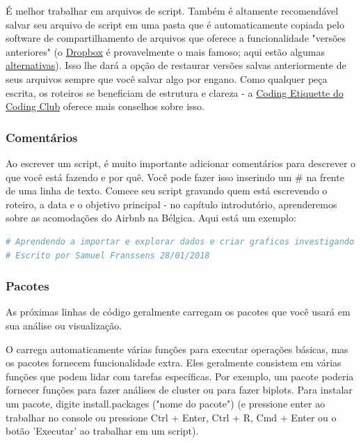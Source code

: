 \documentclass{article}
\begin{document}
É melhor trabalhar em arquivos de script. Também é altamente recomendável salvar seu arquivo de script em uma pasta que é automaticamente copiada pelo software de compartilhamento de arquivos que oferece a funcionalidade "versões anteriores" (o \href{https://www.dropbox.com/business/landing-t61fl-v2?_tk=paid_sem_goog_biz_b&_camp=1411326950&_kw=dropbox|e&_ad=389658655593||c&gclid=CjwKCAjwtqj2BRBYEiwAqfzur1JwrYwkXrKtxYHo_nfrnCMIUBe-IpmrIgCZmTt0l3gibHmKgokdvBoChx8QAvD_BwE}{Dropbox} é provavelmente o mais famoso; aqui estão algumas \href{https://medium.com/@Vanina/dropbox-alternatives-top-5best-cloud-storage-services-2017-a703af7d7796}{alternativas}). Isso lhe dará a opção de restaurar versões salvas anteriormente de seus arquivos sempre que você salvar algo por engano. Como qualquer peça escrita, os roteiros se beneficiam de estrutura e clareza - a \href{https://ourcodingclub.github.io/2017/04/25/etiquette.html}{Coding Etiquette do Coding Club} oferece mais conselhos sobre isso.

\subsubsection{Comentários}

Ao escrever um script, é muito importante adicionar comentários para descrever o que você está fazendo e por quê. Você pode fazer isso inserindo um # na frente de uma linha de texto. Comece seu script gravando quem está escrevendo o roteiro, a data e o objetivo principal - no capítulo introdutório, aprenderemos sobre as acomodações do Airbnb na Bélgica. Aqui está um exemplo:

\begin{lstlisting}[language=R]
# Aprendendo a importar e explorar dados e criar graficos investigando as acomodacoes do Airbnb na Belgica
# Escrito por Samuel Franssens 28/01/2018
\end{lstlisting}

\subsubsection{Pacotes}

As próximas linhas de código geralmente carregam os pacotes que você usará em sua análise ou visualização. 

O \faRProject carrega automaticamente várias funções para executar operações básicas, mas os pacotes fornecem funcionalidade extra. Eles geralmente consistem em várias funções que podem lidar com tarefas específicas. Por exemplo, um pacote poderia fornecer funções para fazer análises de cluster ou para fazer biplots. Para instalar um pacote, digite install.packages ("nome do pacote") (e pressione enter ao trabalhar no console ou pressione Ctrl + Enter, Ctrl + R, Cmd + Enter ou o botão 'Executar' ao trabalhar em um script).
\end{document}
